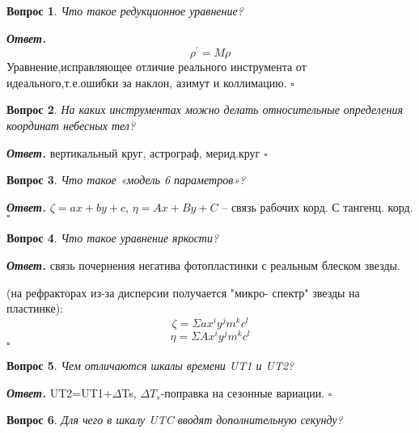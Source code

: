 \documentclass[12pt]{article}
\newtheorem{problem}{Вопрос}
\newenvironment{solution}[1][\it{Ответ}]{\textbf{#1. } }{$\square$}
\begin{document}
		
		\begin{problem}
			Что такое редукционное уравнение?
		\end{problem}
		
		\begin{solution}
			$$\rho^{'}= M\rho$$ 
Уравнение,исправляющее отличие
			реального инструмента от идеального,т.е.ошибки за
			наклон, азимут и коллимацию.
		\end{solution}
		
		\begin{problem}
			На каких инструментах можно
			делать относительные определения
			координат небесных тел? 
		\end{problem}
		
		\begin{solution}
			вертикальный круг, астрограф,
			мерид.круг
		\end{solution}
		
		\begin{problem}
			Что такое «модель 6
			параметров»?
		\end{problem}
		
		\begin{solution}
			$\zeta=ax+by+c$, $\eta=Ax+By+C$
			– связь рабочих корд. С тангенц. корд.
		\end{solution}
		
		\begin{problem}
			Что такое уравнение яркости?
		\end{problem}
		
		\begin{solution}
			связь
			почернения негатива фотопластинки с
			реальным блеском звезды.
			
			(на рефракторах из-за дисперсии получается "микро-
			спектр" звезды на пластинке):
			$$\zeta = \Sigma ax^iy^jm^kc^l$$
			$$\eta = \Sigma Ax^iy^jm^kc^l$$
		\end{solution}
		
		\begin{problem}
			Чем отличаются шкалы времени UT1
			и UT2?
		\end{problem}
		
		\begin{solution}
			UT2=UT1+$\Delta$Ts, $\Delta T_s$-поправка на сезонные
вариации.
		\end{solution}
		
		\begin{problem}
			Для чего в шкалу UTC вводят
			дополнительную секунду?
		\end{problem}
		
\end{document}

